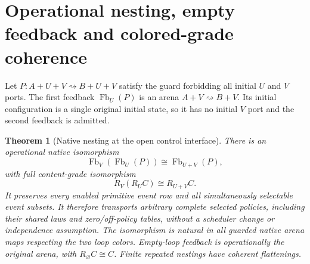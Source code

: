 \documentclass[11pt]{article}
\newtheorem{theorem}{Theorem}\newtheorem{proposition}[theorem]{Proposition}
\begin{document}
\section{Operational nesting, empty feedback and colored-grade coherence}
Let $P:A+U+V\rightsquigarrow B+U+V$ satisfy the guard forbidding all initial $U$ and $V$ ports. The first feedback $\operatorname{Fb}_U(P)$ is an arena $A+V\rightsquigarrow B+V$. Its initial configuration is a single original initial state, so it has no initial $V$ port and the second feedback is admitted.

\begin{theorem}[Native nesting at the open control interface]
There is an operational native isomorphism
\[
 \operatorname{Fb}_V(\operatorname{Fb}_U(P))
 \cong \operatorname{Fb}_{U+V}(P),                         \tag{2}
\]
with full content-grade isomorphism
\[
 R_V(R_UC)\cong R_{U+V}C.                                 \tag{3}
\]
It preserves every enabled primitive event row and all simultaneously selectable event subsets. It therefore transports arbitrary complete selected policies, including their shared laws and zero/off-policy tables, without a scheduler change or independence assumption. The isomorphism is natural in all guarded native arena maps respecting the two loop colors. Empty-loop feedback is operationally the original arena, with $R_{\varnothing}C\cong C$. Finite repeated nestings have coherent flattenings.
\end{theorem}
\end{document}
